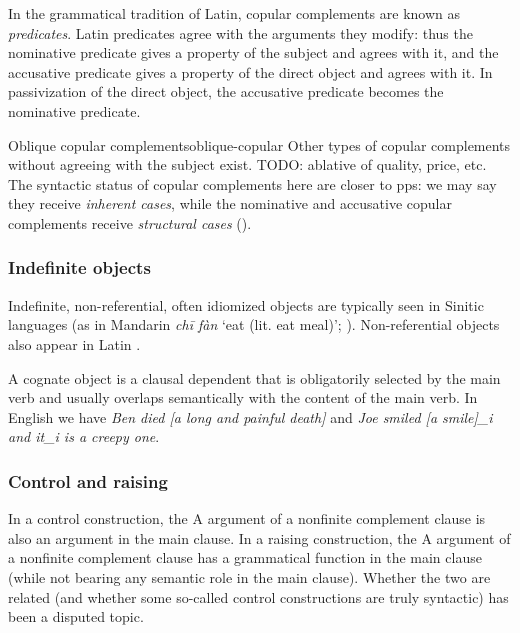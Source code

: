 \documentclass[a4paper, oneside, 12pt]{report}
\newcommand*{\citepage}[1]{p.~{#1}}
\newcommand*{\term}[1]{\emph{#1}}
\newcommand{\form}[1]{\emph{#1}}
\newcommand{\translate}[1]{`#1'}
\begin{document}
In the grammatical tradition of Latin,
copular complements are known as \term{predicates}.
Latin predicates agree with the arguments they modify:
thus the nominative predicate gives a property of the subject and agrees with it,
and the accusative predicate gives a property of the direct object and agrees with it.
In passivization of the direct object,
the accusative predicate becomes the nominative predicate.

\begin{infobox}{Oblique copular complements}{oblique-copular}
    Other types of copular complements without agreeing with the subject exist.
    TODO: ablative of quality, price, etc. 
    The syntactic status of copular complements here are closer to \acs{pp}s:
    we may say they receive \emph{inherent cases},
    while the nominative and accusative copular complements 
    receive \emph{structural cases} 
    ().
\end{infobox}

\subsubsection{Indefinite objects}

Indefinite, non-referential, often idiomized objects are typically seen in Sinitic languages 
(as in Mandarin \form{chī fàn} \translate{eat (lit. eat meal)}; \citealt{li2003np}).
Non-referential objects also appear in Latin \citep[\citepage{54}]{devine2006latin}.

A cognate object is a clausal dependent that is obligatorily selected by the main verb
and usually overlaps semantically with the content of the main verb.
In English we have \form{Ben died [a long and painful death]}
and \form{Joe smiled [a smile]_i and it_i is a creepy one}.


\subsubsection{Control and raising}\label{sec:grammatical.clause.argument.control}

In a control construction, the A argument of a nonfinite complement clause is also an argument in the main clause.
In a raising construction, the A argument of a nonfinite complement clause has a grammatical function in the main clause (while not bearing any semantic role in the main clause).
Whether the two are related (and whether some so-called control constructions are truly syntactic) has been a disputed topic.
\end{document}
